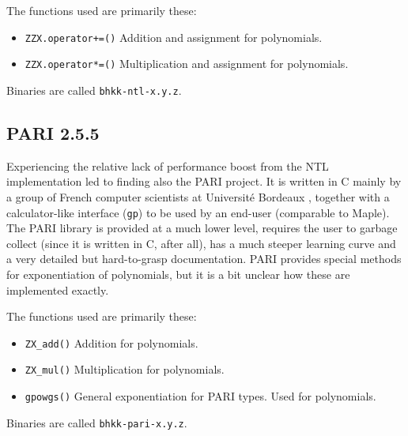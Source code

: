 \documentclass[a4paper]{article}
\newcommand{\code}{\texttt}
\begin{document}
The functions used are primarily these: 

\begin{itemize}
 \item \code{ZZX.operator+=()}
 \subitem Addition and assignment for polynomials. %
 \item \code{ZZX.operator*=()}
 \subitem Multiplication and assignment for polynomials. %
\end{itemize}

Binaries are called \code{bhkk-ntl-x.y.z}.

\subsection{PARI 2.5.5}
Experiencing the relative lack of performance boost from the NTL implementation led to finding also the PARI project. It is written in C mainly by a group of French computer scientists at Université Bordeaux \cite{pari}, together with a calculator-like interface (\code{gp}) to be used by an end-user (comparable to Maple). The PARI library is provided at a much lower level, requires the user to garbage collect (since it is written in C, after all), has a much steeper learning curve and a very detailed but hard-to-grasp documentation. PARI provides special methods for exponentiation of polynomials, but it is a bit unclear how these are implemented exactly.

The functions used are primarily these: 

\begin{itemize}
 \item \code{ZX\_add()}
 \subitem Addition for polynomials. %
 \item \code{ZX\_mul()}
 \subitem Multiplication for polynomials. %
 \item \code{gpowgs()}
 \subitem General exponentiation for PARI types. Used for polynomials.
\end{itemize}

Binaries are called \code{bhkk-pari-x.y.z}.


\end{document}

